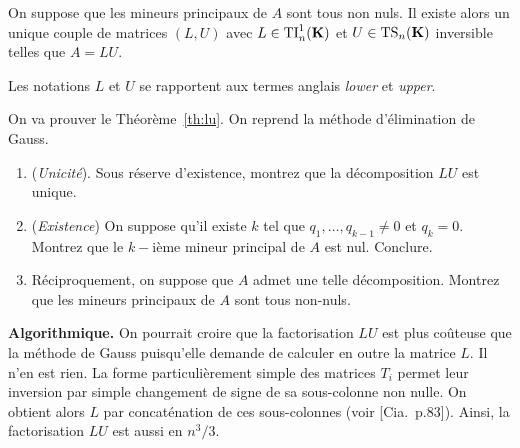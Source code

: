 \begin{theorem}
\label{th:lu}
On suppose que les mineurs principaux de $A$ sont tous non nuls. Il existe
alors un unique couple de matrices $(L,U)$ avec $L \in \mathrm{TI}^1_n(\mathbf{K})$ et $U \in
\mathrm{TS}_n(\mathbf{K})$ inversible telles que $A = LU$.
\end{theorem}
\begin{remark}
Les notations $L$ et $U$ se rapportent aux termes anglais \emph{lower} et
\emph{upper}.
\end{remark}
\begin{exercice}
On va prouver le Théorème~\ref{th:lu}. On reprend la méthode d'élimination de
Gauss.
\begin{enumerate}
\item (\emph{Unicité}). Sous réserve d'existence, montrez que la
	décomposition $LU$ est unique.
\item (\emph{Existence}) On suppose qu'il existe $k$ tel que
	$q_1,\dots,q_{k-1} \neq 0$ et $q_k = 0$. Montrez que le $k-$ième mineur
	principal de $A$ est nul. Conclure.
\item Réciproquement, on suppose que $A$ admet une telle décomposition.
	Montrez que les mineurs principaux de $A$ sont tous non-nuls.
\end{enumerate}
\end{exercice}

{\bf Algorithmique.} On pourrait croire que la factorisation $LU$ est plus
coûteuse que la méthode de Gauss puisqu'elle demande de calculer en outre la
matrice $L$. Il n'en est rien. La forme particulièrement simple des matrices
$T_i$ permet leur inversion par simple changement de signe de sa sous-colonne
non nulle. On obtient alors $L$ par concaténation de ces sous-colonnes (voir
[Cia.~p.83]).
Ainsi, la factorisation $LU$ est aussi en $n^3/3$.

